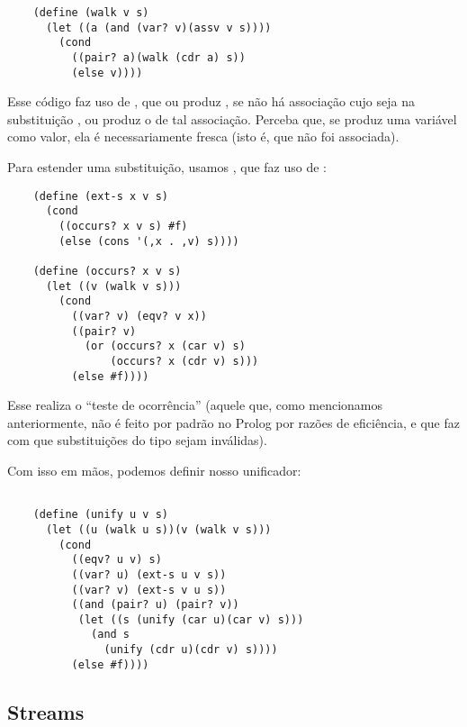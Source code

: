 \documentclass{article}
\begin{document}
  \begin{lstlisting}
    (define (walk v s)
      (let ((a (and (var? v)(assv v s))))
        (cond
          ((pair? a)(walk (cdr a) s))
          (else v))))
  \end{lstlisting}

  \noindent Esse código faz uso de , que ou produz
  , se não há associação cujo  seja
   na substituição , ou produz o
   de tal associação. Perceba que, se 
  produz uma variável como valor, ela é necessariamente fresca (isto
  é, que não foi associada).

  Para estender uma substituição, usamos , que faz
  uso de :

  \begin{lstlisting}
    (define (ext-s x v s)
      (cond
        ((occurs? x v s) #f)
        (else (cons '(,x . ,v) s))))

    (define (occurs? x v s)
      (let ((v (walk v s)))
        (cond
          ((var? v) (eqv? v x))
          ((pair? v)
            (or (occurs? x (car v) s)
                (occurs? x (cdr v) s)))
          (else #f))))
  \end{lstlisting}

  Esse  realiza o ``teste de ocorrência'' (aquele
  que, como mencionamos anteriormente, não é feito por padrão no
  Prolog por razões de eficiência, e que faz com que substituições do
  tipo  sejam inválidas).

  Com isso em mãos, podemos definir nosso unificador:
  \vspace{1.5cm}
  
  \begin{lstlisting}

    (define (unify u v s)
      (let ((u (walk u s))(v (walk v s)))
        (cond
          ((eqv? u v) s)
          ((var? u) (ext-s u v s))
          ((var? v) (ext-s v u s))
          ((and (pair? u) (pair? v))
           (let ((s (unify (car u)(car v) s)))
             (and s
               (unify (cdr u)(cdr v) s))))
          (else #f))))

  \end{lstlisting}

  \subsection{Streams}
\end{document}
